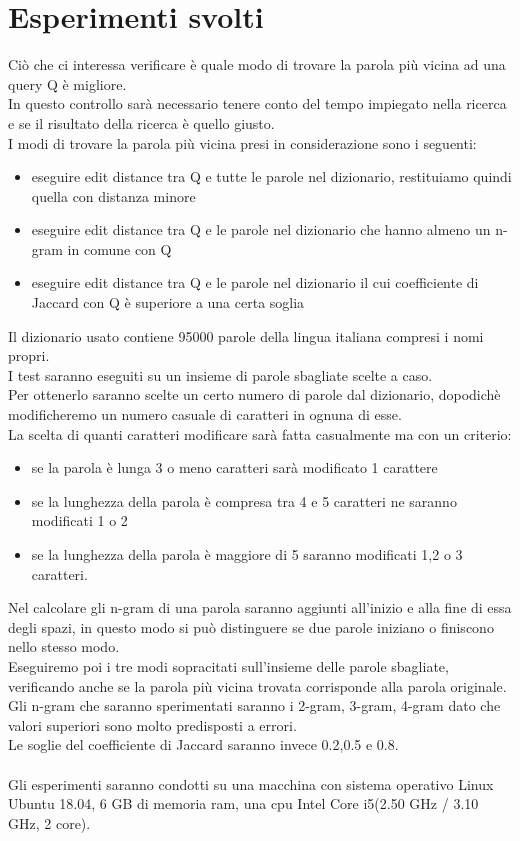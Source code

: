 \documentclass[]{article}
\begin{document}
\section{Esperimenti svolti}
Ciò che ci interessa verificare è quale modo di trovare la parola più vicina ad una query Q è migliore.\\
In questo controllo sarà necessario tenere conto del tempo impiegato nella ricerca e se il risultato della ricerca è quello giusto.\\
I modi di trovare la parola più vicina presi in considerazione sono i seguenti:\\
\begin{itemize}
\item eseguire edit distance tra Q e tutte le parole nel dizionario, restituiamo quindi quella con distanza minore
\item eseguire edit distance tra Q e le parole nel dizionario che hanno almeno un n-gram in comune con Q
\item eseguire edit distance tra Q e le parole nel dizionario il cui coefficiente di Jaccard con Q è superiore a una certa soglia
\end{itemize}
Il dizionario usato contiene 95000 parole della lingua italiana compresi i nomi propri.\\
I test saranno eseguiti su un insieme di parole sbagliate scelte a caso.\\
Per ottenerlo saranno scelte un certo numero di parole dal dizionario, dopodichè modificheremo un numero casuale di caratteri in ognuna di esse.\\
La scelta di quanti caratteri modificare sarà fatta casualmente ma con un criterio:
\begin{itemize}
\item se la parola è lunga 3 o meno caratteri sarà modificato 1 carattere
\item se la lunghezza della parola è compresa tra 4 e 5 caratteri ne saranno modificati 1 o 2
\item se la lunghezza della parola è maggiore di 5 saranno modificati 1,2 o 3 caratteri.
\end{itemize}
Nel calcolare gli n-gram di una parola saranno aggiunti all'inizio e alla fine di essa degli spazi, in questo modo si può distinguere se due parole iniziano o finiscono nello stesso modo.\\ 
Eseguiremo poi i tre modi sopracitati sull'insieme delle parole sbagliate, verificando anche se la parola più vicina trovata corrisponde alla parola originale.\\
Gli n-gram che saranno sperimentati saranno i 2-gram, 3-gram, 4-gram dato che valori superiori sono molto predisposti a errori.\\
Le soglie del coefficiente di Jaccard saranno invece 0.2,0.5 e 0.8.\\\\
Gli esperimenti saranno condotti su una macchina con sistema operativo Linux Ubuntu 18.04, 6 GB di memoria ram, una cpu Intel Core i5(2.50 GHz / 3.10 GHz, 2 core).
\end{document}

